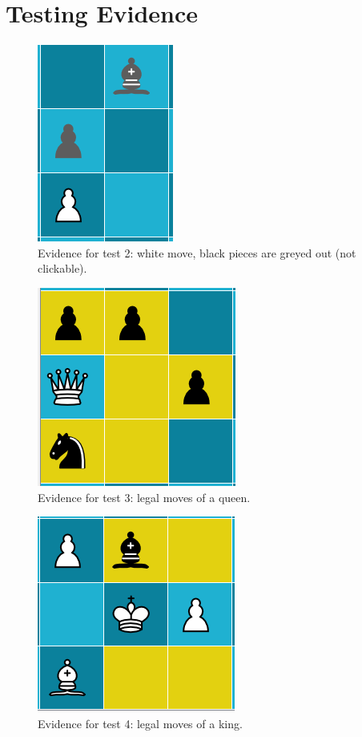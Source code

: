 \documentclass[twoside, 12pt]{report}
\begin{document}
\section{Testing Evidence}
\begin{figure}[H]
	\centering
	\includegraphics{images/screenshots/test-2}
	\caption{Evidence for test 2: white move, black pieces are greyed out (not clickable).}
	\label{test-2}
\end{figure}
\begin{figure}[H]
	\centering
	\includegraphics{images/screenshots/test-3}
	\caption{Evidence for test 3: legal moves of a queen.}
	\label{test-3}
\end{figure}
\begin{figure}[H]
	\centering
	\includegraphics{images/screenshots/test-4}
	\caption{Evidence for test 4: legal moves of a king.}
	\label{test-4}
\end{figure}
\end{document}
